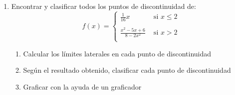 \documentclass[12pt]{article}
\theoremstyle{definition}
\begin{document}
\begin{enumerate}
\item Encontrar y clasificar todos los puntos de discontinuidad de:
\begin{equation*}
f(x) =
\begin{cases} 
\frac{1}{16}x & \text{  si   } x \leq 2 \\
\\
\frac{x^{2}-5x+6}{8-2x^{2}}& \text{  si   } x >2 \\
\end{cases}
\end{equation*}
\begin{enumerate}
\item Calcular los límites laterales en cada punto de discontinuidad
\item Según el resultado obtenido, clasificar cada punto de discontinuidad
\item Graficar con la ayuda de un graficador
\end{enumerate}
\end{enumerate}
\end{document}
